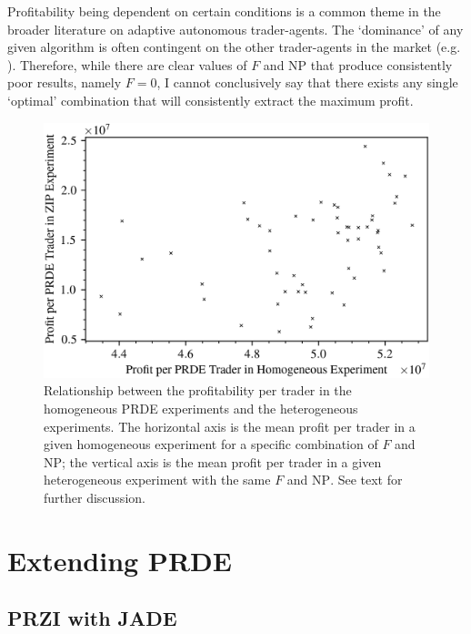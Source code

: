 \documentclass[conference]{IEEEtran}
\begin{document}
Profitability being dependent on certain conditions is a common theme in the broader literature on adaptive autonomous trader-agents.
The `dominance' of any given algorithm is often contingent on the other trader-agents in the market (e.g. \cite{Vach}).
Therefore, while there are clear values of $F$ and $\mathrm{NP}$ that produce consistently poor results, namely $F=0$, I cannot conclusively say that there exists any single `optimal' combination that will consistently extract the maximum profit.

\begin{figure}[htbp]
    \centerline{\includegraphics[width=\columnwidth]{homo_zip_scatter.png}}
    \caption{
        Relationship between the profitability per trader in the homogeneous PRDE experiments and the heterogeneous experiments.
        The horizontal axis is the mean profit per trader in a given homogeneous experiment for a specific combination of $F$ and $\mathrm{NP}$; the vertical axis is the mean profit per trader in a given heterogeneous experiment with the same $F$ and $\mathrm{NP}$.
        See text for further discussion.
    }
    \label{homo_zip_scatter}
\end{figure}

\section{Extending PRDE}

\subsection{PRZI with JADE}
\end{document}
